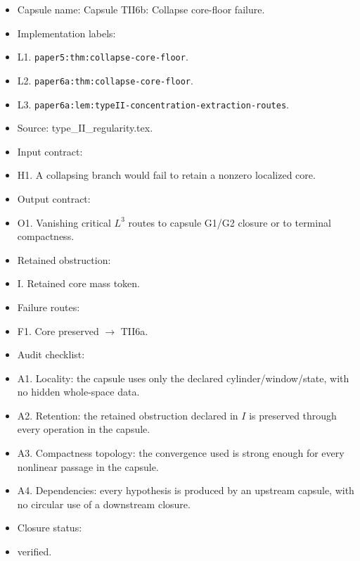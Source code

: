 \documentclass[11pt]{amsart}
\begin{document}
\begin{itemize}
  \item Capsule name: Capsule TII6b: Collapse core-floor failure.
  \item Implementation labels:
  \item L1. \texttt{paper5:thm:collapse-core-floor}.
  \item L2. \texttt{paper6a:thm:collapse-core-floor}.
  \item L3. \texttt{paper6a:lem:typeII-concentration-extraction-routes}.
  \item Source: type\_II\_regularity.tex.
  \item Input contract:
  \item H1. A collapsing branch would fail to retain a nonzero localized core.
  \item Output contract:
  \item O1. Vanishing critical $L^3$ routes to capsule G1/G2 closure or to terminal compactness.
  \item Retained obstruction:
  \item I. Retained core mass token.
  \item Failure routes:
  \item F1. Core preserved $\to$ TII6a.
  \item Audit checklist:
  \item A1. Locality: the capsule uses only the declared cylinder/window/state, with no hidden whole-space data.
  \item A2. Retention: the retained obstruction declared in $I$ is preserved through every operation in the capsule.
  \item A3. Compactness topology: the convergence used is strong enough for every nonlinear passage in the capsule.
  \item A4. Dependencies: every hypothesis is produced by an upstream capsule, with no circular use of a downstream closure.
  \item Closure status:
  \item verified.
\end{itemize}
\end{document}
